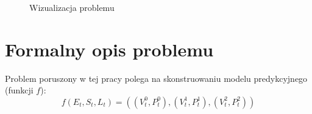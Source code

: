 \begin{figure}[htbp]
    \centering
    \qquad
    \caption{Wizualizacja problemu}
\end{figure}

\newpage

\section{Formalny opis problemu}

\noindent Problem poruszony w tej pracy polega na skonstruowaniu modelu predykcyjnego (funkcji $f$):
\begin{equation}
f(E_{t}, S_{t}, L_{t}) = ((V_{t}^{0}, P_{t}^{0}), (V_{t}^{1}, P_{t}^{1}), (V_{t}^{2}, P_{t}^{2}))
\end{equation}

